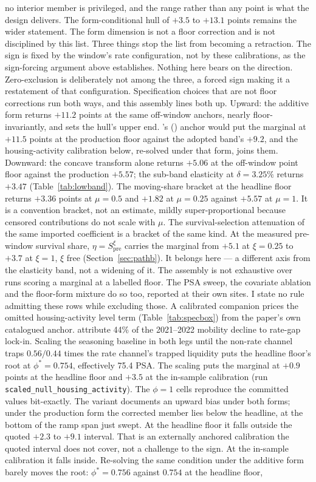 \documentclass[12pt]{article}
\newcommand{\citepos}[1]{\citeauthor{#1}'s (\citeyear{#1})}
\begin{document}
no interior member is privileged, and the range rather than any point is what the design delivers. The form-conditional hull of $+3.5$ to $+13.1$ points remains the wider statement. The form dimension is not a floor correction and is not disciplined by this list. Three things stop the list from becoming a retraction. The sign is fixed by the window's rate configuration, not by these calibrations, as the sign-forcing argument above establishes. Nothing here bears on the direction. Zero-exclusion is deliberately not among the three, a forced sign making it a restatement of that configuration. Specification choices that are not floor corrections run both ways, and this assembly lines both up. Upward: the additive form returns $+11.2$ points at the same off-window anchors, nearly floor-invariantly, and sets the hull's upper end. \citepos{fonseca2024} anchor would put the marginal at $+11.5$ points at the production floor against the adopted band's $+9.2$, and the housing-activity calibration below, re-solved under that form, joins them. Downward: the concave transform alone returns $+5.06$ at the off-window point floor against the production $+5.57$; the sub-band elasticity at $\delta = 3.25\%$ returns $+3.47$ (Table~\ref{tab:lowband}). The moving-share bracket at the headline floor returns $+3.36$ points at $\mu = 0.5$ and $+1.82$ at $\mu = 0.25$ against $+5.57$ at $\mu = 1$. It is a convention bracket, not an estimate, mildly super-proportional because censored contributions do not scale with $\mu$. The survival-selection attenuation of the same imported coefficient is a bracket of the same kind. At the measured pre-window survival share, $\eta = S_{\mathrm{pre}}^{\xi}$ carries the marginal from $+5.1$ at $\xi = 0.25$ to $+3.7$ at $\xi = 1$, $\xi$ free (Section~\ref{sec:pathb}). It belongs here --- a different axis from the elasticity band, not a widening of it. The assembly is not exhaustive over runs scoring a marginal at a labelled floor. The PSA sweep, the covariate ablation and the floor-form mixture do so too, reported at their own sites. I state no rule admitting these rows while excluding those. A calibrated companion prices the omitted housing-activity level term (Table~\ref{tab:specbox}) from the paper's own catalogued anchor. \citet{aladangady2024} attribute 44\% of the 2021--2022 mobility decline to rate-gap lock-in. Scaling the seasoning baseline in both legs until the non-rate channel traps $0.56/0.44$ times the rate channel's trapped liquidity puts the headline floor's root at $\phi^{*} = 0.754$, effectively 75.4 PSA. The scaling puts the marginal at $+0.9$ points at the headline floor and $+3.5$ at the in-sample calibration (run \texttt{scaled\_null\_housing\_activity}). The $\phi = 1$ cells reproduce the committed values bit-exactly. The variant documents an upward bias under both forms; under the production form the corrected member lies below the headline, at the bottom of the ramp span just swept. At the headline floor it falls outside the quoted $+2.3$ to $+9.1$ interval. That is an externally anchored calibration the quoted interval does not cover, not a challenge to the sign. At the in-sample calibration it falls inside. Re-solving the same condition under the additive form barely moves the root: $\phi^{*} = 0.756$ against $0.754$ at the headline floor, 
\end{document}
